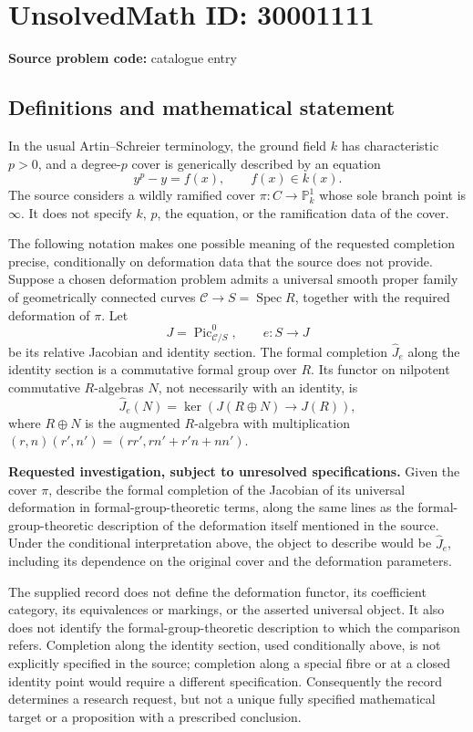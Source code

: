 \documentclass[11pt]{article}
\begin{document}
\section*{UnsolvedMath ID: 30001111}
\textbf{Source problem code:} catalogue entry
\subsection{Definitions and mathematical statement}
In the usual Artin--Schreier terminology, the ground field \(k\) has characteristic \(p>0\), and a degree-\(p\) cover is generically described by an equation
\[
 y^p-y=f(x),\qquad f(x)\in k(x).
\]
The source considers a wildly ramified cover \(\pi:C\to\mathbb P^1_k\) whose sole branch point is \(\infty\). It does not specify \(k\), \(p\), the equation, or the ramification data of the cover.

The following notation makes one possible meaning of the requested completion precise, conditionally on deformation data that the source does not provide. Suppose a chosen deformation problem admits a universal smooth proper family of geometrically connected curves \(\mathcal C\to S=\operatorname{Spec}R\), together with the required deformation of \(\pi\). Let
\[
 J=\operatorname{Pic}^0_{\mathcal C/S},\qquad e:S\longrightarrow J
\]
be its relative Jacobian and identity section. The formal completion \(\widehat J_e\) along the identity section is a commutative formal group over \(R\). Its functor on nilpotent commutative \(R\)-algebras \(N\), not necessarily with an identity, is
\[
 \widehat J_e(N)=\ker\!\left(J(R\oplus N)\longrightarrow J(R)\right),
\]
where \(R\oplus N\) is the augmented \(R\)-algebra with multiplication \((r,n)(r',n')=(rr',rn'+r'n+nn')\).

\textbf{Requested investigation, subject to unresolved specifications.} Given the cover \(\pi\), describe the formal completion of the Jacobian of its universal deformation in formal-group-theoretic terms, along the same lines as the formal-group-theoretic description of the deformation itself mentioned in the source. Under the conditional interpretation above, the object to describe would be \(\widehat J_e\), including its dependence on the original cover and the deformation parameters.

The supplied record does not define the deformation functor, its coefficient category, its equivalences or markings, or the asserted universal object. It also does not identify the formal-group-theoretic description to which the comparison refers. Completion along the identity section, used conditionally above, is not explicitly specified in the source; completion along a special fibre or at a closed identity point would require a different specification. Consequently the record determines a research request, but not a unique fully specified mathematical target or a proposition with a prescribed conclusion.
\end{document}
